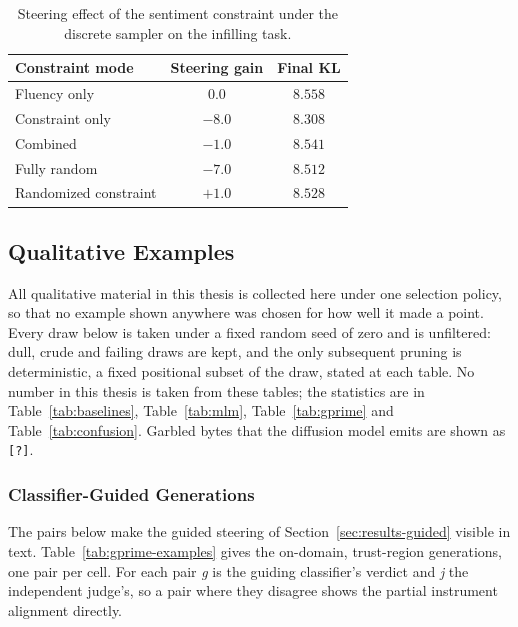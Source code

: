 \begin{table}[htbp]
    \centering
    \small
    \begin{tabular}{lcc}
        \toprule
        Constraint mode & Steering gain & Final KL \\
        \midrule
        Fluency only & $0.0$ & $8.558$ \\
        Constraint only & $-8.0$ & $8.308$ \\
        Combined & $-1.0$ & $8.541$ \\
        Fully random & $-7.0$ & $8.512$ \\
        Randomized constraint & $+1.0$ & $8.528$ \\
        \bottomrule
    \end{tabular}
    \caption[Steering effect of the sentiment constraint, discrete sampler, infilling.]{Steering effect of the sentiment constraint under the discrete sampler on the infilling task.}
    \label{tab:constrained}
\end{table}

\subsection{Qualitative Examples}
\label{app:gprime-examples}
\label{app:showcase}

All qualitative material in this thesis is collected here under one selection policy, so that no example shown anywhere was chosen for how well it made a point. Every draw below is taken under a fixed random seed of zero and is unfiltered: dull, crude and failing draws are kept, and the only subsequent pruning is deterministic, a fixed positional subset of the draw, stated at each table. No number in this thesis is taken from these tables; the statistics are in Table~\ref{tab:baselines}, Table~\ref{tab:mlm}, Table~\ref{tab:gprime} and Table~\ref{tab:confusion}. Garbled bytes that the diffusion model emits are shown as \texttt{[?]}.

\subsubsection{Classifier-Guided Generations}
\label{app:examples-guided}
The pairs below make the guided steering of Section~\ref{sec:results-guided} visible in text. Table~\ref{tab:gprime-examples} gives the on-domain, trust-region generations, one pair per cell. For each pair \emph{g} is the guiding classifier's verdict and \emph{j} the independent judge's, so a pair where they disagree shows the partial instrument alignment directly.


